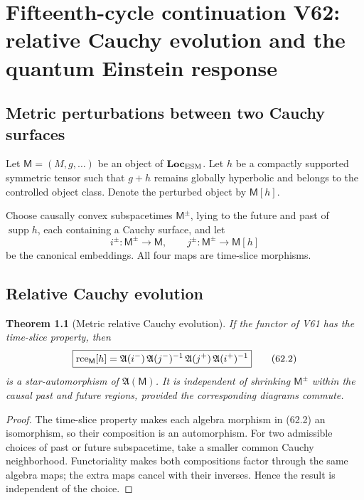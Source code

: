 \documentclass[11pt]{article}
\newtheorem{theorem}{Theorem}[section]
\theoremstyle{remark}
\begin{document}
\chapter{Fifteenth-cycle continuation V62: relative Cauchy evolution and the quantum Einstein response}
\label{sec:v15v62}

\section{Metric perturbations between two Cauchy surfaces}

Let \({\mathsf M}=(M,g,\ldots)\) be an object of
\({\bf Loc}_{\rm ESM}\).  Let \(h\) be a compactly supported
symmetric tensor such that \(g+h\) remains globally hyperbolic and
belongs to the controlled object class.  Denote the perturbed object
by \({\mathsf M}[h]\).

Choose causally convex subspacetimes \({\mathsf M}^\pm\), lying to
the future and past of \(\operatorname{supp}h\), each containing a
Cauchy surface, and let
\[
 i^\pm:{\mathsf M}^\pm\to{\mathsf M},\qquad
 j^\pm:{\mathsf M}^\pm\to{\mathsf M}[h]                 \tag{62.1}
\]
be the canonical embeddings.  All four maps are time-slice
morphisms.

\section{Relative Cauchy evolution}

\begin{theorem}[Metric relative Cauchy evolution]
\label{thm:v15v62-rce}
If the functor of V61 has the time-slice property, then
\[
 \boxed{
 {\rm rce}_{\mathsf M}[h]
 =
 {\mathfrak A}(i^-)\,
 {\mathfrak A}(j^-)^{-1}\,
 {\mathfrak A}(j^+)\,
 {\mathfrak A}(i^+)^{-1}}                               \tag{62.2}
\]
is a star-automorphism of
\({\mathfrak A}({\mathsf M})\).  It is independent of shrinking
\({\mathsf M}^\pm\) within the causal past and future regions,
provided the corresponding diagrams commute.
\end{theorem}

\begin{proof}
The time-slice property makes each algebra morphism in (62.2) an
isomorphism, so their composition is an automorphism.  For two
admissible choices of past or future subspacetime, take a smaller
common Cauchy neighborhood.  Functoriality makes both compositions
factor through the same algebra maps; the extra maps cancel with
their inverses.  Hence the result is independent of the choice.
\end{proof}
\end{document}
